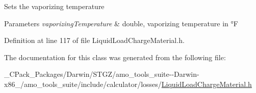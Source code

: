 Sets the vaporizing temperature 
\begin{DoxyParams}{Parameters}
{\em vaporizing\+Temperature} & double, vaporizing temperature in °F \\
\hline
\end{DoxyParams}


Definition at line 117 of file Liquid\+Load\+Charge\+Material.\+h.



The documentation for this class was generated from the following file\+:\begin{DoxyCompactItemize}
\item 
\+\_\+\+C\+Pack\+\_\+\+Packages/\+Darwin/\+S\+T\+G\+Z/amo\+\_\+tools\+\_\+suite-\/-\/\+Darwin-\/x86\+\_/amo\+\_\+tools\+\_\+suite/include/calculator/losses/\hyperlink{___c_pack___packages_2_darwin_2_s_t_g_z_2amo__tools__suite--_darwin-x86__64_2amo__tools__suite_22c7eb4395ab7cdaebdd8c8124e88f284}{Liquid\+Load\+Charge\+Material.\+h}\end{DoxyCompactItemize}
